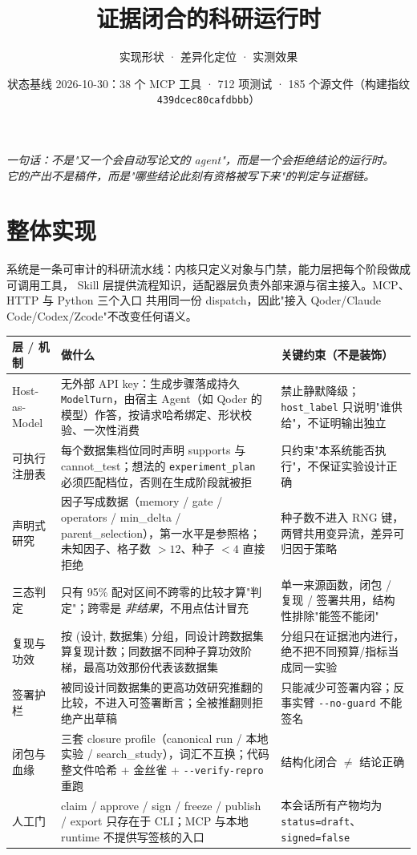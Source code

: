 \documentclass[11pt,a4paper]{ctexart}
\title{\color{accent}\textbf{证据闭合的科研运行时}}
\author{实现形状 · 差异化定位 · 实测效果}
\date{\small 状态基线 2026-10-30：38 个 MCP 工具 · 712 项测试 · 185 个源文件（构建指纹 \texttt{439dcec80cafdbbb}）}
\begin{document}
\maketitle
\vspace{-1.4em}
\begin{center}
\small\itshape 一句话：不是"又一个会自动写论文的 agent"，而是一个会拒绝结论的运行时。\\
它的产出不是稿件，而是"哪些结论此刻有资格被写下来"的判定与证据链。
\end{center}

\section{整体实现}

系统是一条可审计的科研流水线：内核只定义对象与门禁，能力层把每个阶段做成可调用工具，
Skill 层提供流程知识，适配器层负责外部来源与宿主接入。MCP、HTTP 与 Python 三个入口
共用同一份 dispatch，因此"接入 Qoder/Claude Code/Codex/Zcode"不改变任何语义。

\begin{longtable}{p{2.9cm}p{5.1cm}p{6.6cm}}
\toprule
\textbf{层 / 机制} & \textbf{做什么} & \textbf{关键约束（不是装饰）} \\
\midrule
\endhead
Host-as-Model & 无外部 API key：生成步骤落成持久 \texttt{ModelTurn}，由宿主 Agent（如 Qoder 的模型）作答，按请求哈希绑定、形状校验、一次性消费 & 禁止静默降级；\texttt{host\_label} 只说明"谁供给"，不证明输出独立 \\
\addlinespace
可执行注册表 & 每个数据集档位同时声明 supports 与 cannot\_test；想法的 \texttt{experiment\_plan} 必须匹配档位，否则在生成阶段就被拒 & 只约束"本系统能否执行"，不保证实验设计正确 \\
\addlinespace
声明式研究 & 因子写成数据（memory / gate / operators / min\_delta / parent\_selection），第一水平是参照格；未知因子、格子数 $>12$、种子 $<4$ 直接拒绝 & 种子数不进入 RNG 键，两臂共用变异流，差异可归因于策略 \\
\addlinespace
三态判定 & 只有 95\% 配对区间不跨零的比较才算"判定"；跨零是 \emph{非结果}，不用点估计冒充 & 单一来源函数，闭包 / 复现 / 签署共用，结构性排除"能签不能闭" \\
\addlinespace
复现与功效 & 按 (设计, 数据集) 分组，同设计跨数据集算复现计数；同数据不同种子算功效阶梯，最高功效那份代表该数据集 & 分组只在证据池内进行，绝不把不同预算/指标当成同一实验 \\
\addlinespace
签署护栏 & 被同设计同数据集的更高功效研究推翻的比较，不进入可签署断言；全被推翻则拒绝产出草稿 & 只能减少可签署内容；反事实臂 \texttt{-\/-no-guard} 不能签名 \\
\addlinespace
闭包与血缘 & 三套 closure profile（canonical run / 本地实验 / search\_study），词汇不互换；代码整文件哈希 + 金丝雀 + \texttt{-\/-verify-repro} 重跑 & 结构化闭合 $\neq$ 结论正确 \\
\addlinespace
人工门 & claim / approve / sign / freeze / publish / export 只存在于 CLI；MCP 与本地 runtime 不提供写签核的入口 & 本会话所有产物均为 \texttt{status=draft}、\texttt{signed=false} \\
\bottomrule
\end{longtable}
\end{document}
